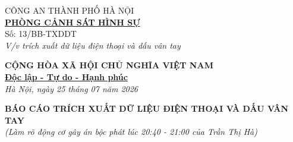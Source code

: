 \documentclass[12pt,a4paper]{article}
\begin{document}
\noindent
\begin{minipage}[t]{0.45\textwidth}
    \begin{center}
        \small
        CÔNG AN THÀNH PHỐ HÀ NỘI\\
        \textbf{\underline{PHÒNG CẢNH SÁT HÌNH SỰ}}\\[0.1cm]
        Số: 13/BB-TXDDT\\
        \textit{V/v trích xuất dữ liệu điện thoại và dấu vân tay}
    \end{center}
\end{minipage}
\hfill
\begin{minipage}[t]{0.52\textwidth}
    \begin{center}
        \small
        \textbf{CỘNG HÒA XÃ HỘI CHỦ NGHĨA VIỆT NAM}\\
        \textbf{\underline{Độc lập - Tự do - Hạnh phúc}}\\[0.1cm]
        \textit{Hà Nội, ngày 25 tháng 07 năm 2026}
    \end{center}
\end{minipage}

\vspace{0.6cm}

\begin{center}
    \textbf{\large BÁO CÁO TRÍCH XUẤT DỮ LIỆU ĐIỆN THOẠI VÀ DẤU VÂN TAY}\\
    \textit{(Làm rõ động cơ gây án bộc phát lúc 20:40 - 21:00 của Trần Thị Hà)}
\end{center}

\vspace{0.3cm}
\end{document}
